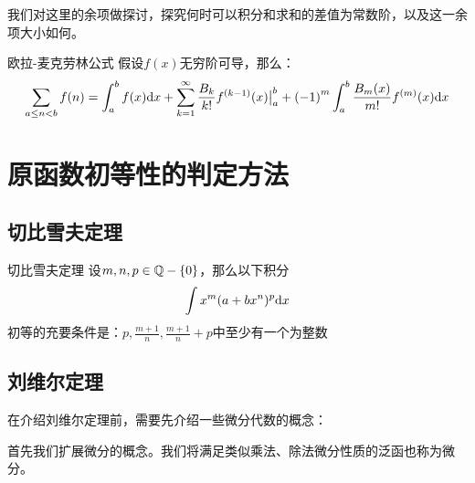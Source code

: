 \documentclass[12pt, a4paper, oneside, UTF8]{ctexbook}
\begin{document}
		我们对这里的余项做探讨，探究何时可以积分和求和的差值为常数阶，以及这一余项大小如何。
		\begin{them}{欧拉-麦克劳林公式}{}
			假设$f(x)$无穷阶可导，那么：
			\begin{equation}
				\sum\limits_{a\leq n<b}f(n) = \int_{a}^{b}f(x)\mathrm{d} x+\sum\limits_{k=1}^{\infty}\frac{B_k}{k!}f^{(k-1)}(x)\big|_{a}^{b}+{(-1)}^{m}\int_{a}^{b}\frac{B_m({x})}{m!}f^{(m)}(x)\mathrm{d} x
			\end{equation}
			
		\end{them}
	
	\section{原函数初等性的判定方法}
		\subsection{切比雪夫定理}
			\begin{them}{切比雪夫定理}{}
				设$m,n,p\in \mathbb{Q}-\{0\}$，那么以下积分
				\begin{equation}
					\int x^m(a+bx^n)^p \mathrm{d} x
				\end{equation}
				初等的充要条件是：$p,\frac{m+1}{n},\frac{m+1}{n}+p$中至少有一个为整数
			\end{them}
		\subsection{刘维尔定理}
			在介绍刘维尔定理前，需要先介绍一些微分代数的概念：
			
			首先我们扩展微分的概念。我们将满足类似乘法、除法微分性质的泛函也称为微分。
			
\end{document}
